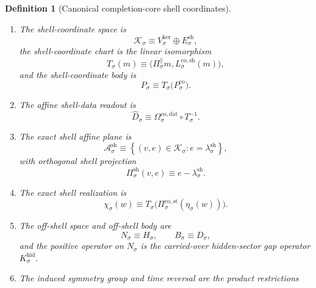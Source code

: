 \documentclass[11pt]{article}
\newcommand{\CoreStateBody}[1]{P_{#1}^{\mathrm{co}}}
\newcommand{\CoreStateProj}[1]{\Pi_{#1}^{\mathrm{co,st}}}
\newcommand{\CoreDataMap}[1]{\Omega_{#1}^{\mathrm{co,dat}}}
\newcommand{\CoreShellMap}[1]{\Omega_{#1}^{\mathrm{co,sh}}}
\newcommand{\CoreEmbed}[1]{\eta_{#1}}
\newcommand{\GapSpace}[1]{H_{#1}}
\newcommand{\GapBody}[1]{D_{#1}}
\newcommand{\HiddenOperator}[1]{K_{#1}^{\mathrm{hid}}}
\newcommand{\CoordSpace}[1]{\mathcal K_{#1}}
\newcommand{\CoordBody}[1]{P_{#1}}
\newcommand{\NormalSpace}[1]{N_{#1}}
\newcommand{\NormalBody}[1]{B_{#1}}
\newcommand{\AffineData}[1]{\widehat D_{#1}}
\newcommand{\ShellAffine}[1]{\mathcal A_{#1}^{\mathrm{sh}}}
\newcommand{\ShellNormal}[1]{E_{#1}^{\mathrm{sh}}}
\newcommand{\ShellProj}[1]{\Pi_{#1}^{\mathrm{sh}}}
\newcommand{\ShellEmbed}[1]{\chi_{#1}}
\newcommand{\CoreShellLin}[1]{L_{#1}^{\mathrm{co,sh}}}
\newcommand{\ShellOffset}[1]{\lambda_{#1}^{\mathrm{sh}}}
\newcommand{\ShellKer}[1]{V_{#1}^{\mathrm{ker}}}
\newcommand{\DirProj}[1]{\Pi_{#1}^{\parallel}}
\newcommand{\CoordIso}[1]{T_{#1}}
\newtheorem{definition}{Definition}
\begin{document}
\begin{definition}[Canonical completion-core shell coordinates]
\begin{enumerate}
\begin{equation}
    \CoreShellMap{\sigma}(m)
    =
    \CoreShellLin{\sigma}(m)-\ShellOffset{\sigma}.
    \label{eq:shelldecomp}
    \end{equation}
    \item The shell-coordinate space is
    \[
    \CoordSpace{\sigma}\equiv
    \ShellKer{\sigma}\oplus\ShellNormal{\sigma},
    \]
    the shell-coordinate chart is the linear isomorphism
    \begin{equation}
    \CoordIso{\sigma}(m)
    \equiv
    \bigl(
    \DirProj{\sigma}m,
    \CoreShellLin{\sigma}(m)
    \bigr),
    \label{eq:coordiso}
    \end{equation}
    and the shell-coordinate body is
    \begin{equation}
    \CoordBody{\sigma}
    \equiv
    \CoordIso{\sigma}\bigl(\CoreStateBody{\sigma}\bigr).
    \label{eq:coordbody}
    \end{equation}
    \item The affine shell-data readout is
    \begin{equation}
    \AffineData{\sigma}
    \equiv
    \CoreDataMap{\sigma}\circ\CoordIso{\sigma}^{-1}.
    \label{eq:affinedata}
    \end{equation}
    \item The exact shell affine plane is
    \begin{equation}
    \ShellAffine{\sigma}
    \equiv
    \left\{
    (v,e)\in\CoordSpace{\sigma}:
    e=\ShellOffset{\sigma}
    \right\},
    \label{eq:shellplane}
    \end{equation}
    with orthogonal shell projection
    \begin{equation}
    \ShellProj{\sigma}(v,e)
    \equiv
    e-\ShellOffset{\sigma}.
    \label{eq:shellproj}
    \end{equation}
    \item The exact shell realization is
    \begin{equation}
    \ShellEmbed{\sigma}(w)
    \equiv
    \CoordIso{\sigma}
    \bigl(
    \CoreStateProj{\sigma}(\CoreEmbed{\sigma}(w))
    \bigr).
    \label{eq:shellembed}
    \end{equation}
    \item The off-shell space and off-shell body are
    \[
    \NormalSpace{\sigma}\equiv\GapSpace{\sigma},
    \qquad
    \NormalBody{\sigma}\equiv\GapBody{\sigma},
    \]
    and the positive operator on \(\NormalSpace{\sigma}\) is the carried-over hidden-sector gap operator \(\HiddenOperator{\sigma}\).
    \item The induced symmetry group and time reversal are the product restrictions

\end{enumerate}
\end{definition}
\end{document}
